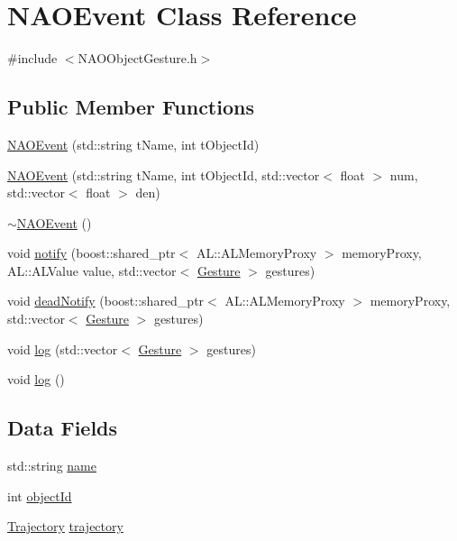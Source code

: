 \hypertarget{classNAOEvent}{\section{\-N\-A\-O\-Event \-Class \-Reference}
\label{classNAOEvent}
}


{\ttfamily \#include $<$\-N\-A\-O\-Object\-Gesture.\-h$>$}

\subsection*{\-Public \-Member \-Functions}
\begin{DoxyCompactItemize}
\item 
\hyperlink{classNAOEvent_af3956556d15f7f1c2cc0159ba94e38a5}{\-N\-A\-O\-Event} (std\-::string t\-Name, int t\-Object\-Id)
\item 
\hyperlink{classNAOEvent_a4666a26283b3c22b452a2663a6425403}{\-N\-A\-O\-Event} (std\-::string t\-Name, int t\-Object\-Id, std\-::vector$<$ float $>$ num, std\-::vector$<$ float $>$ den)
\item 
\hyperlink{classNAOEvent_ab34eb80057804b5ec32a7ac7fa1660aa}{$\sim$\-N\-A\-O\-Event} ()
\item 
void \hyperlink{classNAOEvent_a2f54db1bd6c3cf488a3e73f28565020d}{notify} (boost\-::shared\-\_\-ptr$<$ \-A\-L\-::\-A\-L\-Memory\-Proxy $>$ memory\-Proxy, \-A\-L\-::\-A\-L\-Value value, std\-::vector$<$ \hyperlink{classGesture}{\-Gesture} $>$ gestures)
\item 
void \hyperlink{classNAOEvent_a0f2237229d55cd93b1a5575b5f7ef7e2}{dead\-Notify} (boost\-::shared\-\_\-ptr$<$ \-A\-L\-::\-A\-L\-Memory\-Proxy $>$ memory\-Proxy, std\-::vector$<$ \hyperlink{classGesture}{\-Gesture} $>$ gestures)
\item 
void \hyperlink{classNAOEvent_abf97c71e408169a98743a349ba5c48ec}{log} (std\-::vector$<$ \hyperlink{classGesture}{\-Gesture} $>$ gestures)
\item 
void \hyperlink{classNAOEvent_a65be6226586a0159bd2541ed60bd4060}{log} ()
\end{DoxyCompactItemize}
\subsection*{\-Data \-Fields}
\begin{DoxyCompactItemize}
\item 
std\-::string \hyperlink{classNAOEvent_af65dc0b2d023e857c39b0c185963763c}{name}
\item 
int \hyperlink{classNAOEvent_a8a63b16157fd1c205a382bff04d32e26}{object\-Id}
\item 
\hyperlink{classTrajectory}{\-Trajectory} \hyperlink{classNAOEvent_a308aec441df98356019a18d5e977cf11}{trajectory}
\end{DoxyCompactItemize}


